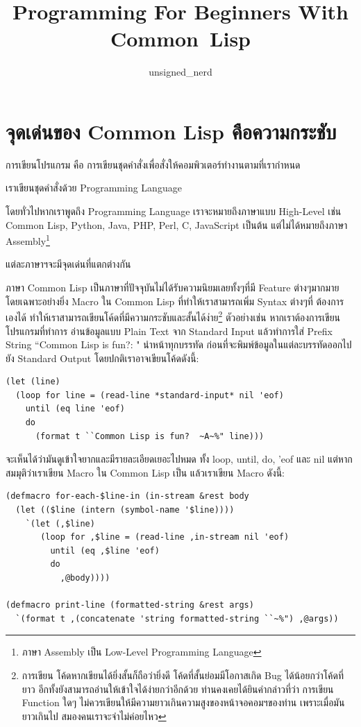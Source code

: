 \documentclass[a4paper]{article}
\begin{document}
\title{Programming For Beginners With Common~Lisp}
\author{unsigned\_nerd}
\maketitle

\tableofcontents

\section{จุดเด่นของ Common Lisp คือความกระชับ}

การเขียนโปรแกรม คือ การเขียนชุดคำสั่งเพื่อสั่งให้คอมพิวเตอร์ทำงานตามที่เรากำหนด

เราเขียนชุดคำสั่งด้วย Programming Language

โดยทั่วไปหากเราพูดถึง Programming Language เราจะหมายถึงภาษาแบบ High-Level เช่น
Common Lisp, Python, Java, PHP, Perl, C, JavaScript เป็นต้น
แต่ไม่ได้หมายถึงภาษา Assembly\footnote{ภาษา Assembly เป็น Low-Level
Programming Language}

แต่ละภาษาฯจะมีจุดเด่นที่แตกต่างกัน

ภาษา Common Lisp เป็นภาษาที่ปัจจุบันไม่ได้รับความนิยมเลยทั้งๆที่มี Feature ต่างๆมากมาย 
โดยเฉพาะอย่างยิ่ง Macro ใน Common Lisp ที่ทำให้เราสามารถเพิ่ม Syntax ต่างๆที่%
ต้องการเองได้ ทำให้เราสามารถเขียนโค้ดที่มีความกระชับและสั้นได้ง่าย\footnote{การเขียน%
โค้ดหากเขียนได้ยิ่งสั้นก็ถือว่ายิ่งดี โค้ดที่สั้นย่อมมีโอกาสเกิด Bug ได้น้อยกว่าโค้ดที่ยาว
อีกทั้งยังสามารถอ่านให้เข้าใจได้ง่ายกว่าอีกด้วย ท่านคงเคยได้ยินคำกล่าวที่ว่า การเขียน
Function ใดๆ ไม่ควรเขียนให้มีความยาวเกินความสูงของหน้าจอคอมฯของท่าน เพราะเมื่อมัน%
ยาวเกินไป สมองคนเราจะจำไม่ค่อยไหว} ตัวอย่างเช่น หากเราต้องการเขียนโปรแกรมที่ทำการ%
อ่านข้อมูลแบบ Plain Text จาก Standard Input
แล้วทำการใส่ Prefix String ``Common Lisp is fun?: " นำหน้าทุกบรรทัด
ก่อนที่จะพิมพ์ข้อมูลในแต่ละบรรทัดออกไปยัง Standard Output โดยปกติเราอาจเขียนโค้ดดังนี้:

\begin{lstlisting}[caption=โค้ดแบบปกติ\label{lst:regular-print-each-line-code}]
(let (line)
  (loop for line = (read-line *standard-input* nil 'eof)
    until (eq line 'eof)
    do
      (format t ``Common Lisp is fun?  ~A~%" line)))
\end{lstlisting}

จะเห็นได้ว่ามันดูเข้าใจยากและมีรายละเอียดเยอะไปหมด ทั้ง loop, until, do, 'eof และ
nil แต่หากสมมุติว่าเราเขียน Macro ใน Common Lisp เป็น แล้วเราเขียน Macro ดังนี้:

\begin{lstlisting}[caption=Macro for-each-\$line-in \& print-line]
(defmacro for-each-$line-in (in-stream &rest body
  (let (($line (intern (symbol-name '$line))))
    `(let (,$line)
       (loop for ,$line = (read-line ,in-stream nil 'eof)
         until (eq ,$line 'eof)
         do
           ,@body))))

(defmacro print-line (formatted-string &rest args)
  `(format t ,(concatenate 'string formatted-string ``~%") ,@args))
\end{lstlisting}
\end{document}
